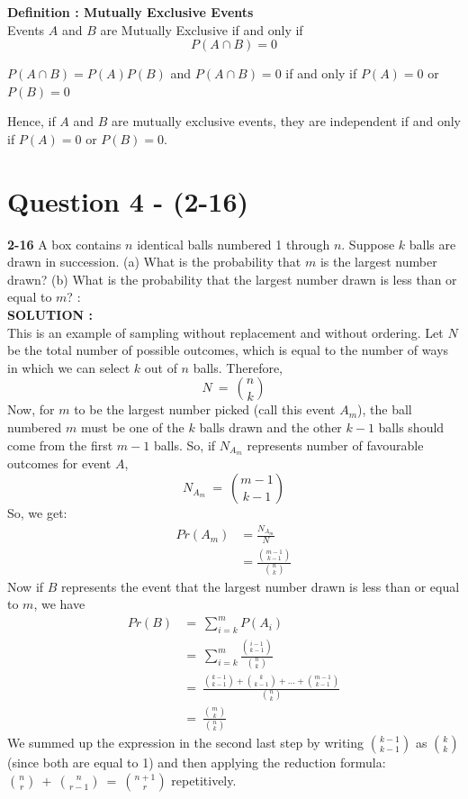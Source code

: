 \documentclass{article}
\begin{document}
\textbf{Definition : Mutually Exclusive Events} \\
Events $A$ and $B$ are Mutually Exclusive if and only if \\
$$P(A \cap B) = 0  $$

$P(A \cap B) = P(A) P(B)  $ and $P(A \cap B) = 0  $ if and only if $P(A) = 0$ or $P(B) = 0$

Hence, if $A$ and $B$ are mutually exclusive events, they are independent if and only if $P(A) = 0$ or $P(B) = 0$.
\section{Question 4 - (2-16)}
\label{Q4}
\textbf{2-16}  A box contains $n$ identical balls numbered 1 through $n$. Suppose $k$ balls are drawn in succession. (a) What is the probability that $m$ is the largest number drawn? (b) What is the probability that the largest number drawn is less than or equal to $m$?  : \\

\hspace{1em} \large{\textbf{SOLUTION :}} \\
This is an example of sampling without replacement and without ordering. Let $N$ be the total number of possible outcomes, which is equal to the number of ways in which we can select $k$ out of $n$ balls. Therefore,
\begin{equation*}
    N\ = \ {n \choose k }
\end{equation*}
Now, for $m$ to be the largest number picked (call this event $A_m$), the ball numbered $m$ must be one of the $k$ balls drawn and the other $k-1$ balls should come from the first $m-1$ balls. So, if $N_{A_m}$ represents number of favourable outcomes for event $A$,
\begin{equation*}
    N_{A_m}\ =\ {m-1 \choose k-1}
\end{equation*}
So, we get:
\begin{equation*}
\begin{split}
Pr(A_m) & = \frac{N_{A_m}}{N} \\
 & = \frac{{m-1 \choose k-1}}{{n \choose k }} 
\end{split}
\end{equation*}
Now if $B$ represents the event that the largest number drawn is less than or equal to $m$, we have
\begin{equation*}
\begin{split}
    Pr(B) & =\ \sum_{i=k}^{m} P(A_i) \\
            &=\ \sum_{i=k}^{m} \frac{{i-1 \choose k-1}}{{n \choose k}} \\
            &=\ \frac{{k-1 \choose k-1} + {k \choose k-1} + \dots + {m-1 \choose k-1}}{{n \choose k}} \\
            &=\ \frac{{m \choose k }}{{n \choose k}}
\end{split}
\end{equation*}
We summed up the expression in the second last step by writing ${k-1 \choose k-1}$ as ${k \choose k}$ (since both are equal to 1) and then applying the reduction formula: ${n \choose r}\ +\ {n \choose r-1}\ =\ {n+1 \choose r}$ repetitively.
\end{document}
